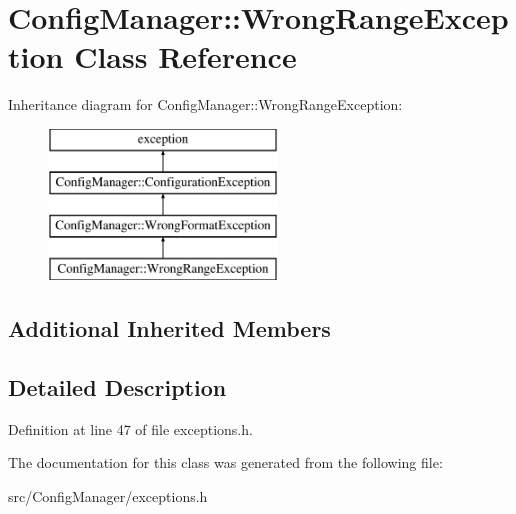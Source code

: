 \hypertarget{class_config_manager_1_1_wrong_range_exception}{}\section{Config\+Manager\+:\+:Wrong\+Range\+Exception Class Reference}
\label{class_config_manager_1_1_wrong_range_exception}
Inheritance diagram for Config\+Manager\+:\+:Wrong\+Range\+Exception\+:\begin{figure}[H]
\begin{center}
\leavevmode
\includegraphics[height=4.000000cm]{class_config_manager_1_1_wrong_range_exception}
\end{center}
\end{figure}
\subsection*{Additional Inherited Members}


\subsection{Detailed Description}


Definition at line 47 of file exceptions.\+h.



The documentation for this class was generated from the following file\+:\begin{DoxyCompactItemize}
\item 
src/\+Config\+Manager/exceptions.\+h\end{DoxyCompactItemize}

